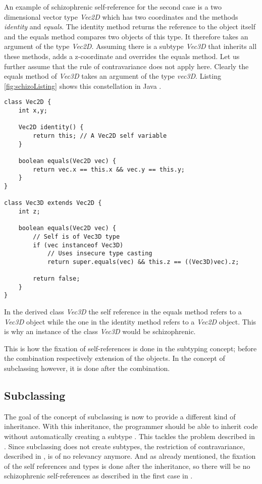An example of schizophrenic self-reference for the second case is a
two dimensional vector type \emph{Vec2D} which has two coordinates and
the methods \emph{identity} and \emph{equals}. The identity method
returns the reference to the object itself and the equals method
compares two objects of this type. It therefore takes an argument
of the type \emph{Vec2D}. Assuming there is a subtype \emph{Vec3D}
that inherits all these methods, adds a z-coordinate and overrides the
equals method. Let us further assume that the rule of contravariance
does not apply here. Clearly the equals method of \emph{Vec3D} takes
an argument of the type \emph{vec3D}. Listing \ref{fig:schizoListing}
shows this constellation in Java \cite{simons_theory_2003-2}.

\begin{lstlisting}[float=h,caption={An example of schizophrenic self-reference},label={fig:schizoListing}]
class Vec2D {
	int x,y;

	Vec2D identity() {
		return this; // A Vec2D self variable
	}

	boolean equals(Vec2D vec) {
		return vec.x == this.x && vec.y == this.y;
	}
}

class Vec3D extends Vec2D {
	int z;

	boolean equals(Vec2D vec) {
		// Self is of Vec3D type
		if (vec instanceof Vec3D)
			// Uses insecure type casting
			return super.equals(vec) && this.z == ((Vec3D)vec).z;

		return false;
	}
}
\end{lstlisting}

In the derived class \emph{Vec3D} the self reference in the equals
method refers to a \emph{Vec3D} object while the one in the identity method
refers to a \emph{Vec2D} object. This is why an instance of the class
\emph{Vec3D} would be schizophrenic.

This is how the fixation of self-references is done in the subtyping
concept; before the combination respectively extension of the objects. In the
concept of subclassing however, it is done after the combination.

\subsection{Subclassing}
 The goal of the concept of subclassing
is now to provide a different kind of inheritance. With this inheritance,
the programmer should be able to inherit code without automatically
creating a subtype \cite{simons_theory_2002-2}. This tackles the
problem described in . Since subclassing does
not create subtypes, the restriction of contravariance, described in
, is of no relevancy anymore. And as already
mentioned, the fixation of the self references and types is done after
the inheritance, so there will be no schizophrenic self-references as
described in the first case in .

